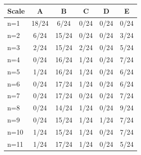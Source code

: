 \begin{tabular}{lccccc}
\toprule
Scale & \cellcolor[HTML]{FFFFFF} A & \cellcolor[HTML]{EA4646} B & \cellcolor[HTML]{9670BD} C & \cellcolor[HTML]{8FEB32} D & \cellcolor[HTML]{19C8C8} E \\
\midrule
n=1 & \cellcolor[HTML]{FFFFFF} 18/24 & \cellcolor[HTML]{EA4646} 6/24 & \cellcolor[HTML]{9670BD} 0/24 & \cellcolor[HTML]{8FEB32} 0/24 & \cellcolor[HTML]{19C8C8} 0/24 \\
n=2 & \cellcolor[HTML]{FFFFFF} 6/24 & \cellcolor[HTML]{EA4646} 15/24 & \cellcolor[HTML]{9670BD} 0/24 & \cellcolor[HTML]{8FEB32} 0/24 & \cellcolor[HTML]{19C8C8} 3/24 \\
n=3 & \cellcolor[HTML]{FFFFFF} 2/24 & \cellcolor[HTML]{EA4646} 15/24 & \cellcolor[HTML]{9670BD} 2/24 & \cellcolor[HTML]{8FEB32} 0/24 & \cellcolor[HTML]{19C8C8} 5/24 \\
n=4 & \cellcolor[HTML]{FFFFFF} 0/24 & \cellcolor[HTML]{EA4646} 16/24 & \cellcolor[HTML]{9670BD} 1/24 & \cellcolor[HTML]{8FEB32} 0/24 & \cellcolor[HTML]{19C8C8} 7/24 \\
n=5 & \cellcolor[HTML]{FFFFFF} 1/24 & \cellcolor[HTML]{EA4646} 16/24 & \cellcolor[HTML]{9670BD} 1/24 & \cellcolor[HTML]{8FEB32} 0/24 & \cellcolor[HTML]{19C8C8} 6/24 \\
n=6 & \cellcolor[HTML]{FFFFFF} 0/24 & \cellcolor[HTML]{EA4646} 17/24 & \cellcolor[HTML]{9670BD} 1/24 & \cellcolor[HTML]{8FEB32} 0/24 & \cellcolor[HTML]{19C8C8} 6/24 \\
n=7 & \cellcolor[HTML]{FFFFFF} 0/24 & \cellcolor[HTML]{EA4646} 17/24 & \cellcolor[HTML]{9670BD} 0/24 & \cellcolor[HTML]{8FEB32} 0/24 & \cellcolor[HTML]{19C8C8} 7/24 \\
n=8 & \cellcolor[HTML]{FFFFFF} 0/24 & \cellcolor[HTML]{EA4646} 14/24 & \cellcolor[HTML]{9670BD} 1/24 & \cellcolor[HTML]{8FEB32} 0/24 & \cellcolor[HTML]{19C8C8} 9/24 \\
n=9 & \cellcolor[HTML]{FFFFFF} 0/24 & \cellcolor[HTML]{EA4646} 15/24 & \cellcolor[HTML]{9670BD} 1/24 & \cellcolor[HTML]{8FEB32} 1/24 & \cellcolor[HTML]{19C8C8} 7/24 \\
n=10 & \cellcolor[HTML]{FFFFFF} 1/24 & \cellcolor[HTML]{EA4646} 15/24 & \cellcolor[HTML]{9670BD} 1/24 & \cellcolor[HTML]{8FEB32} 0/24 & \cellcolor[HTML]{19C8C8} 7/24 \\
n=11 & \cellcolor[HTML]{FFFFFF} 1/24 & \cellcolor[HTML]{EA4646} 17/24 & \cellcolor[HTML]{9670BD} 1/24 & \cellcolor[HTML]{8FEB32} 0/24 & \cellcolor[HTML]{19C8C8} 5/24 \\

\end{tabular}
